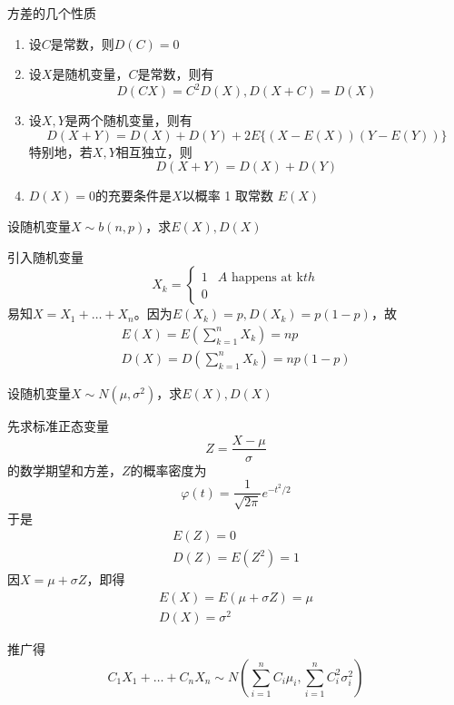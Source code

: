 \documentclass[11pt]{article}
\begin{document}
方差的几个性质
\begin{enumerate}
\item 设\(C\)是常数，则\(D(C)=0\)
\item 设\(X\)是随机变量，\(C\)是常数，则有
\begin{equation*}
D(CX)=C^2D(X),D(X+C)=D(X)
\end{equation*}
\item 设\(X,Y\)是两个随机变量，则有
\begin{equation*}
D(X+Y)=D(X)+D(Y)+2E\{(X-E(X))(Y-E(Y))\}
\end{equation*}
特别地，若\(X,Y\)相互独立，则
\begin{equation*}
D(X+Y)=D(X)+D(Y)
\end{equation*}
\item \(D(X)=0\)的充要条件是\(X\)以概率 1 取常数 \(E(X)\)
\end{enumerate}


\begin{examplle}[]
设随机变量\(X\sim b(n,p)\)，求\(E(X),D(X)\)

引入随机变量
\begin{equation*}
X_k=
\begin{cases}
1&A\text{ happens at k}th\\
0&
\end{cases}
\end{equation*}
易知\(X=X_1+\dots+X_n\)。因为\(E(X_k)=p,D(X_k)=p(1-p)\)，故
\begin{gather*}
E(X)=E(\sum_{k=1}^nX_k)=np\\
D(X)=D(\sum_{k=1}^n X_k)=np(1-p)
\end{gather*}
\end{examplle}

\begin{examplle}[]
设随机变量\(X\sim N(\mu,\sigma^2)\)，求\(E(X),D(X)\)

先求标准正态变量
\begin{equation*}
Z=\frac{X-\mu}{\sigma}
\end{equation*}
的数学期望和方差，\(Z\)的概率密度为
\begin{equation*}
\varphi(t)=\frac{1}{\sqrt{2\pi}}e^{-t^2/2}
\end{equation*}
于是
\begin{gather*}
 E(Z)=0\\
 D(Z)=E(Z^2)=1
\end{gather*}
因\(X=\mu+\sigma Z\)，即得
\begin{gather*}
E(X)=E(\mu+\sigma Z)=\mu\\
D(X)=\sigma^2
\end{gather*}

推广得
\begin{equation*}
C_1X_1+\dots+C_nX_n\sim N(\sum_{i=1}^n C_i\mu_i,\sum_{i=1}^n C_i^2\sigma^2_i)
\end{equation*}
\end{examplle}
\end{document}
